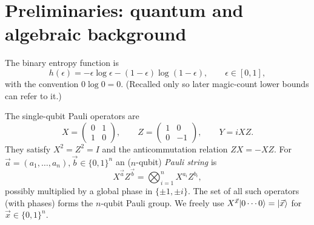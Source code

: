 %

\chapter{Preliminaries: quantum and algebraic background}


\begin{definition}
  \label{def:binary-entropy}
  \mathlibok
  The binary entropy function is
  \[
    h(\epsilon) = -\epsilon \log \epsilon - (1-\epsilon)\log(1-\epsilon),
    \qquad \epsilon \in [0,1],
  \]
  with the convention $0\log 0 = 0$. (Recalled only so later magic-count lower
  bounds can refer to it.)
\end{definition}


\begin{definition}
  \label{def:pauli}
  The single-qubit Pauli operators are
  \[
    X = \begin{pmatrix} 0 & 1 \\ 1 & 0 \end{pmatrix}, \qquad
    Z = \begin{pmatrix} 1 & 0 \\ 0 & -1 \end{pmatrix}, \qquad
    Y = iXZ.
  \]
  They satisfy $X^2 = Z^2 = I$ and the anticommutation relation $ZX = -XZ$.
  For $\vec a = (a_1,\dots,a_n), \vec b \in \{0,1\}^n$ an ($n$-qubit) \emph{Pauli
  string} is
  \[
    X^{\vec a} Z^{\vec b}
      = \bigotimes_{i=1}^n X^{a_i} Z^{b_i},
  \]
  possibly multiplied by a global phase in $\{\pm 1, \pm i\}$. The set of all
  such operators (with phases) forms the $n$-qubit Pauli group. We freely use
  $X^{\vec x}\lvert 0\cdots 0\rangle = \lvert \vec x\rangle$ for $\vec x\in\{0,1\}^n$.
\end{definition}

